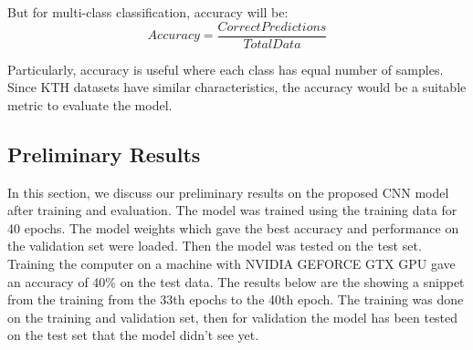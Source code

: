 But for multi-class classification, accuracy will be:
\begin{equation}
 Accuracy = \frac{Correct Predictions}{Total Data}
\end{equation}



Particularly, accuracy is useful where each class has equal number of samples. Since KTH datasets have similar characteristics, the accuracy would be a suitable metric to evaluate the model.
\subsection {Preliminary Results}
\hspace{5mm} In this section, we discuss our preliminary results on the proposed CNN model after training and evaluation. The model was trained using the training data for 40 epochs. The model weights which gave the best accuracy and performance on the validation set were loaded. Then the model was tested on the test set. Training the computer on a machine with NVIDIA GEFORCE GTX GPU gave an accuracy of 40\% on the test data.
The results below are the showing a snippet from the training from the 33th epochs to the 40th epoch. The training was done on the training and validation set, then for validation the model has been tested on the test set that the model didn’t see yet.\\

